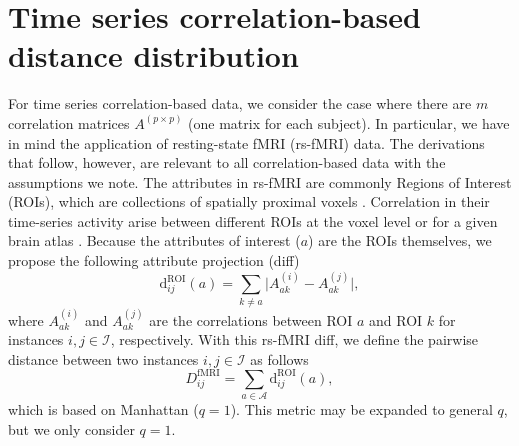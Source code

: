 \documentclass[aos]{imsart}
\begin{document}
\section{Time series correlation-based distance distribution}\label{sec:rs-fMRI_distances}

For time series correlation-based data, we consider the case where there are $m$ correlation matrices $A^{(p \times p)}$ (one matrix for each subject). In particular, we have in mind the application of resting-state fMRI (rs-fMRI) data. The derivations that follow, however, are relevant to all correlation-based data with the assumptions we note. The attributes in rs-fMRI are commonly Regions of Interest (ROIs), which are collections of spatially proximal voxels \cite{lee2013}. Correlation in their time-series activity arise between different ROIs at the voxel level or for a given brain atlas \cite{dickie2017}. Because the attributes of interest ($a$) are the ROIs themselves, we propose the following attribute projection (diff)
%
\begin{equation}\label{eq:diff_rs-fMRI}
\text{d}^\text{ROI}_{ij}(a) = \sum_{k \neq a}\bigl|A^{(i)}_{ak} - A^{(j)}_{ak}\bigr|,
\end{equation}
%
where $A^{(i)}_{ak}$ and $A^{(j)}_{ak}$ are the correlations between ROI $a$ and ROI $k$ for instances $i,j \in \mathcal{I}$, respectively. With this rs-fMRI diff, we define the pairwise distance between two instances $i,j \in \mathcal{I}$ as follows
%
\begin{equation}\label{eq:D_rs-fMRI}
D^\text{fMRI}_{ij} = \sum_{a \in \mathcal{A}} \text{d}^\text{ROI}_{ij}(a),
\end{equation}
%
which is based on Manhattan ($q=1$). This metric may be expanded to general $q$, but we only consider $q=1$.
\end{document}
